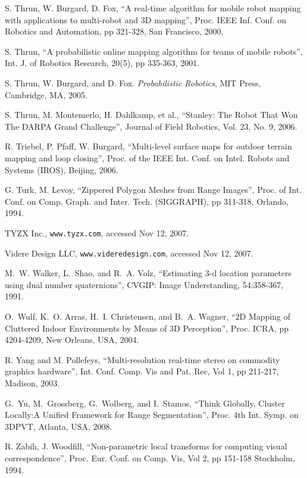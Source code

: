 \documentclass[twocolumn,oneside]{book}
\begin{document}
\begin{thebibliography}{99}
S. Thrun, W. Burgard, D. Fox,
``A real-time algorithm for mobile robot mapping with applications to
multi-robot and 3D mapping'',  
Proc. IEEE Inf. Conf. on Robotics and Automation, pp 321-328, San Francisco, 2000.

S. Thrun, 
``A probabilistic online mapping algorithm for teams of mobile robots'',
Int. J. of Robotics Research, 20(5), pp 335-363, 2001.

S. Thrun, W. Burgard, and D. Fox. 
{\em Probabilistic Robotics}, MIT Press, Cambridge, MA, 2005.

S. Thrun, M. Montemerlo, H. Dahlkamp, et al.,
``Stanley: The Robot That Won The DARPA Grand Challenge'',
Journal of Field Robotics, Vol. 23, No. 9, 2006.

R. Triebel, P. Pfaff, W. Burgard,
``Multi-level surface maps for outdoor terrain mapping and loop closing'',
Proc. of the IEEE Int. Conf. on Intel. Robots and Systems (IROS), Beijing, 2006.

G. Turk, M. Levoy,
``Zippered Polygon Meshes from Range Images'',
Proc.  of Int. Conf. on Comp. Graph. and Inter. Tech. (SIGGRAPH), pp 311-318, Orlando, 1994.

TYZX Inc.,
\verb+www.tyzx.com+, accessed Nov 12, 2007.

Videre Design LLC,
\verb+www.videredesign.com+, accessed Nov 12, 2007.

M.~W. Walker, L.~Shao, and R.~A. Volz,
``Estimating 3-d location parameters using dual number quaternions'',
CVGIP: Image Understanding, 54:358-367, 1991.

O.~Wulf, K.~O. Arras, H.~I. Christensen, and B.~A. Wagner,
``{2D} {M}apping of {C}luttered {I}ndoor {E}nvironments by {M}eans of
  {3D} {P}erception'',
Proc. ICRA, pp 4204-4209, New Orleans, USA, 2004.

R. Yang and M. Pollefeys,
``Multi-resolution real-time stereo on commodity graphics hardware'',
Int. Conf. Comp. Vis and Pat. Rec, Vol 1, pp 211-217, Madison, 2003.

G.~Yu, M.~Grossberg, G.~Wolberg, and I.~Stamos,
``Think Globally, Cluster Locally:A Unified Framework for Range Segmentation'',
Proc. 4th Int. Symp. on 3DPVT, Atlanta, USA, 2008.

R. Zabih,  J. Woodfill,
``Non-parametric local transforms for computing visual correspondence'',
Proc. Eur. Conf. on Comp. Vis, Vol 2, pp 151-158 Stockholm, 1994.


\end{thebibliography}
\end{document}

